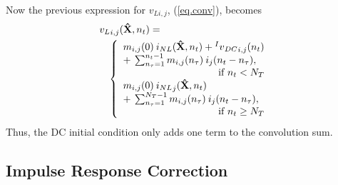 %
Now the previous expression for $v_{Li,j}$, (\ref{eq.conv}), becomes
%
\begin{eqnarray}
\lefteqn{{v_L}_{i,j}({\bf \hat{X}},n_t) =} \nonumber \\
 & &	\left\{ \begin{array}{l}
        {m_{i,j}(0) \: i_{NL}({\bf \hat{X}},n_t)} + {{^Iv}_{DC}}_{i,j}(n_t) \\
           + \: \sum_{n_{\tau}=1}^{n_t - 1} m_{i,j}(n_{\tau}) \:
                    i_j(n_t - n_{\tau}), \\
	\multicolumn{1}{r}{\mbox{if $n_t < N_T$}} \\
	   {m_{i,j}(0) \: {i_{NL}}_j({\bf \hat{X}},n_t)} \\
           + \: \sum_{n_{\tau}=1}^{N_T-1} m_{i,j}(n_{\tau}) \:
                    i_j(n_t - n_{\tau}), \\
	\multicolumn{1}{r}{\mbox{if $n_t \ge N_T$}}
	\end{array} \right. \label{eq.dcconv} 
\end{eqnarray}
%
Thus, the DC initial condition only adds one term to the convolution
sum.




\subsection{Impulse Response Correction}

